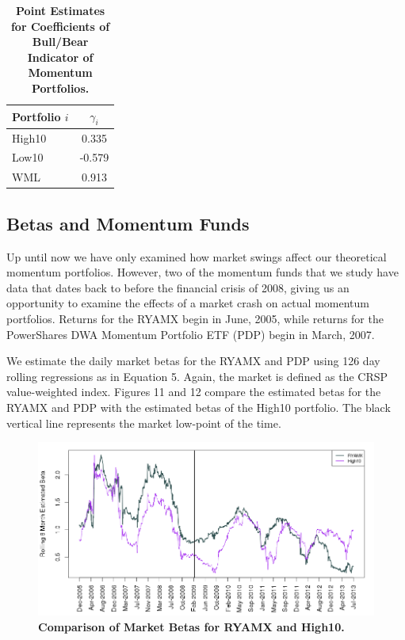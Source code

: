 \documentclass[12pt]{article}
\begin{document}
\begin{table}[h]
\centering
\caption{\textbf{Point Estimates for Coefficients of Bull/Bear Indicator of Momentum Portfolios.}}
\begin{tabular}{l | c }
\hline
Portfolio $i$ & $\gamma_{i}$ \\
\hline
High10 & 0.335 \\
Low10 & -0.579 \\
WML & 0.913 \\
\end{tabular}
\end{table}

\subsection{Betas and Momentum Funds}

Up until now we have only examined how market swings affect our theoretical momentum portfolios. However, two of the momentum funds that we study have data that dates back to before the financial crisis of 2008, giving us an opportunity to examine the effects of a market crash on actual momentum portfolios. Returns for the RYAMX begin in June, 2005, while returns for the PowerShares DWA Momentum Portfolio ETF (PDP) begin in March, 2007.

We estimate the daily market betas for the RYAMX and PDP using 126 day rolling regressions as in Equation 5. Again, the market is defined as the CRSP value-weighted index. Figures 11 and 12 compare the estimated betas for the RYAMX and PDP with the estimated betas of the High10 portfolio. The black vertical line represents the market low-point of the time. 

\begin{figure}[p]
\caption{\textbf{Comparison of Market Betas for RYAMX and High10.}}
\includegraphics[scale=0.45]{RYAMXbetas.png}
\end{figure}
\end{document}
